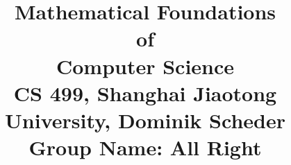 



\usepackage{graphicx,amsmath,amssymb,amsthm, boxedminipage,xcolor}

\usepackage{algorithm}
\usepackage{algpseudocode}


\newtheorem{theorem}{Theorem}[section]
\newtheorem{proposition}[theorem]{Proposition}
\newtheorem{lemma}[theorem]{Lemma}
\newtheorem{corollary}[theorem]{Corollary}
\newtheorem{definition}[theorem]{Definition}

\newtheorem*{theorem*}{Theorem}
\newtheorem*{lemma*}{Lemma}
\newtheorem*{proposition*}{Proposition}


\newtheorem{exercise}[theorem]{Exercise}
\newtheorem{exerciseD}[theorem]{*Exercise}
\newtheorem{exerciseDD}[theorem]{**Exercise}

\let\oldexercise\exercise
\renewcommand{\exercise}{\oldexercise\normalfont}


\newcommand{\E}{\mathbb{E}}
\newcommand{\scalar}[2]{\ensuremath{\langle #1, #2\rangle}}
\newcommand{\floor}[1]{\left\lfloor #1 \right\rfloor}
\newcommand{\ceil}[1]{\left\lceil #1 \right\rceil}
\newcommand{\norm}[1]{\|#1\|}
\newcommand{\pfrac}[2]{\left(\frac{#1}{#2}\right)}
\newcommand{\nth}[1]{#1^{\textsuperscript{th}}}
\newcommand{\core}{\textnormal{core}}





\newcommand{\poly}{\textnormal{poly}}
\newcommand{\quasipol}{\textnormal{quasipol}}
\newcommand{\ssubexp}{\textnormal{stronglySubExp}}
\newcommand{\wsubexp}{\textnormal{weaklySubExp}}
\newcommand{\simplyexp}{\textnormal{E}}
\newcommand{\expo}{\textnormal{Exp}}



\newcommand{\N}{\mathbb{N}}
\newcommand{\nn}{\mathbb{N}_0^n}
\newcommand{\R}{\mathbb{R}}
\newcommand{\Z}{\mathbb{Z}}




\date{}

\title{
	Mathematical Foundations \\of \\Computer Science\\
	\vspace{3mm}
	{\normalsize CS 499,	Shanghai Jiaotong University,  Dominik Scheder\\}
	{\normalsize Group Name: \textbf{All Right}}
}



\maketitle

